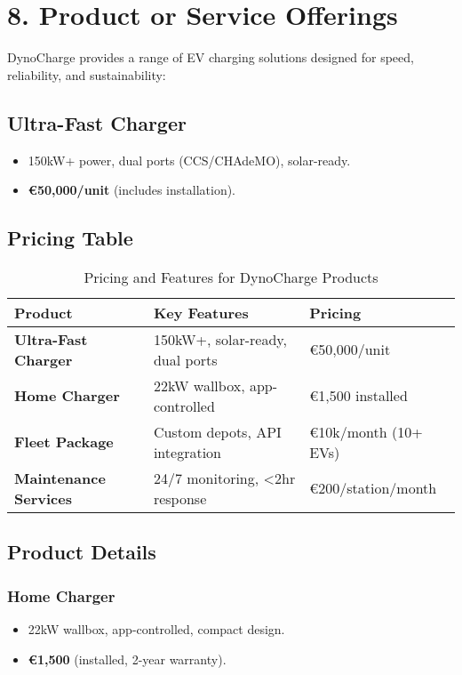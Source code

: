 
\section{8. Product or Service Offerings}

DynoCharge provides a range of EV charging solutions designed for speed, reliability, and sustainability:

\subsection*{Ultra-Fast Charger}
\begin{itemize}
    \item 150kW+ power, dual ports (CCS/CHAdeMO), solar-ready.
    \item \textbf{€50,000/unit} (includes installation).
\end{itemize}

\subsection*{Pricing Table}
\begin{table}[h!]
    \centering
    \renewcommand{\arraystretch}{1.5}
    \begin{tabular}{|>{\bfseries}m{}|m{}|m{}|}
    \hline
    \textbf{Product} & \textbf{Key Features} & \textbf{Pricing} \\
    \hline
    Ultra-Fast Charger & 150kW+, solar-ready, dual ports & €50,000/unit \\
    \hline
    Home Charger & 22kW wallbox, app-controlled & €1,500 installed \\
    \hline
    Fleet Package & Custom depots, API integration & €10k/month (10+ EVs) \\
    \hline
    Maintenance Services & 24/7 monitoring, <2hr response & €200/station/month \\
    \hline
    \end{tabular}
    \caption{Pricing and Features for DynoCharge Products}
\end{table}

\subsection*{Product Details}

\subsubsection*{Home Charger}
\begin{itemize}
    \item 22kW wallbox, app-controlled, compact design.
    \item \textbf{€1,500} (installed, 2-year warranty).
\end{itemize}

